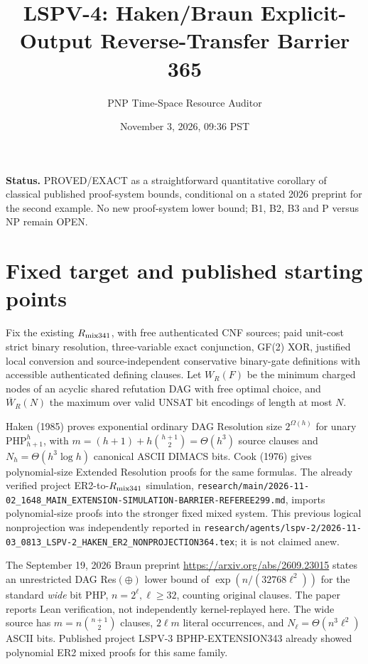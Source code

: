 \documentclass[11pt]{article}
\title{LSPV-4: Haken/Braun Explicit-Output Reverse-Transfer Barrier 365}
\author{PNP Time-Space Resource Auditor}
\date{November 3, 2026, 09:36 PST}
\begin{document}
\maketitle
\noindent\textbf{Status.} PROVED/EXACT as a straightforward quantitative corollary of classical published proof-system bounds, conditional on a stated 2026 preprint for the second example. No new proof-system lower bound; B1, B2, B3 and P versus NP remain OPEN.

\section*{Fixed target and published starting points}
Fix the existing $R_{\rm mix341}$, with free authenticated CNF sources; paid unit-cost strict binary resolution, three-variable exact conjunction, GF(2) XOR, justified local conversion and source-independent conservative binary-gate definitions with accessible authenticated defining clauses. Let $W_R(F)$ be the minimum charged nodes of an acyclic shared refutation DAG with free optimal choice, and $\overline W_R(N)$ the maximum over valid UNSAT bit encodings of length at most $N$.

Haken (1985) proves exponential ordinary DAG Resolution size $2^{\Omega(h)}$ for unary $\mathrm{PHP}_{h+1}^h$, with $m=(h+1)+h\binom{h+1}{2}=\Theta(h^3)$ source clauses and $N_h=\Theta(h^3\log h)$ canonical ASCII DIMACS bits. Cook (1976) gives polynomial-size Extended Resolution proofs for the same formulas. The already verified project ER2-to-$R_{\rm mix341}$ simulation, \texttt{research/main/2026-11-02\_1648\_MAIN\_EXTENSION-SIMULATION-BARRIER-REFEREE299.md}, imports polynomial-size proofs into the stronger fixed mixed system. This previous logical nonprojection was independently reported in \texttt{research/agents/lspv-2/2026-11-03\_0813\_LSPV-2\_HAKEN\_ER2\_NONPROJECTION364.tex}; it is not claimed anew.

The September 19, 2026 Braun preprint \url{https://arxiv.org/abs/2609.23015} states an unrestricted DAG Res$(\oplus)$ lower bound of $\exp(n/(32768\ell^2))$ for the standard \emph{wide} bit PHP, $n=2^\ell,\ell\ge32$, counting original clauses. The paper reports Lean verification, not independently kernel-replayed here. The wide source has $m=n\binom{n+1}{2}$ clauses, $2\ell m$ literal occurrences, and $N_\ell=\Theta(n^3\ell^2)$ ASCII bits. Published project LSPV-3 BPHP-EXTENSION343 already showed polynomial ER2 mixed proofs for this same family.
\end{document}
